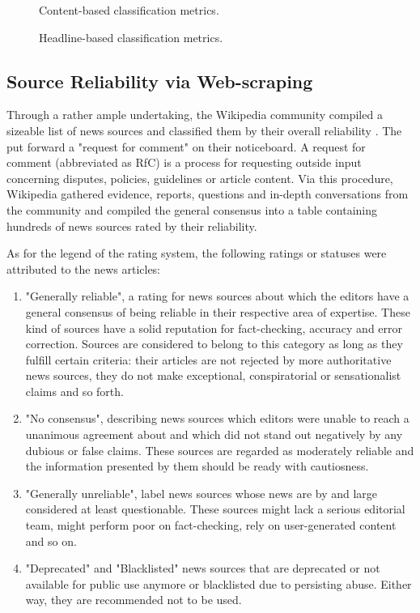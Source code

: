 \begin{figure}[H]
  \centering
  \caption{Content-based classification metrics.}
\end{figure}

\begin{figure}[H]
  \centering
  \caption{Headline-based classification metrics.}
\end{figure}

\subsection{Source Reliability via Web-scraping}
Through a rather ample undertaking, the Wikipedia community compiled a sizeable list of news sources and classified them by their overall reliability \cite{wiki_reliable_sources}. The put forward a "request for comment" on their noticeboard. A request for comment (abbreviated as RfC) is a process for requesting outside input concerning disputes, policies, guidelines or article content. Via this procedure, Wikipedia gathered evidence, reports, questions and in-depth conversations from the community and compiled the general consensus into a table containing hundreds of news sources rated by their reliability.

As for the legend of the rating system, the following ratings or statuses were attributed to the news articles:
\begin{enumerate}
  \item "Generally reliable", a rating for news sources about which the editors have a general consensus of being reliable in their respective area of expertise. These kind of sources have a solid reputation for fact-checking, accuracy and error correction. Sources are considered to belong to this category as long as they fulfill certain criteria: their articles are not rejected by more authoritative news sources, they do not make exceptional, conspiratorial or sensationalist claims and so forth.
  \item "No consensus", describing news sources which editors were unable to reach a unanimous agreement about and which did not stand out negatively by any dubious or false claims. These sources are regarded as moderately reliable and the information presented by them should be ready with cautiosness.
  \item "Generally unreliable", label news sources whose news are by and large considered at least questionable. These sources might lack a serious editorial team, might perform poor on fact-checking, rely on user-generated content and so on. 
  \item "Deprecated" and "Blacklisted" news sources that are deprecated or not available for public use anymore or blacklisted due to persisting abuse. Either way, they are recommended not to be used.
\end{enumerate}

